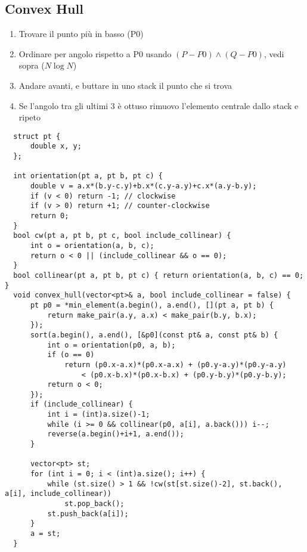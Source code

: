 \subsection{Convex Hull}
\begin{enumerate}
    \item Trovare il punto più in basso (P0)
    \item Ordinare per angolo rispetto a P0 usando $(P-P0)\wedge(Q-P0)$, vedi sopra ($N\log N$)
    \item Andare avanti, e buttare in uno stack il punto che si trova
    \item Se l’angolo tra gli ultimi 3 è ottuso rimuovo l’elemento centrale dallo stack e ripeto
\end{enumerate}

\begin{lstlisting}
  struct pt {
      double x, y;
  };

  int orientation(pt a, pt b, pt c) {
      double v = a.x*(b.y-c.y)+b.x*(c.y-a.y)+c.x*(a.y-b.y);
      if (v < 0) return -1; // clockwise
      if (v > 0) return +1; // counter-clockwise
      return 0;
  }
  bool cw(pt a, pt b, pt c, bool include_collinear) {
      int o = orientation(a, b, c);
      return o < 0 || (include_collinear && o == 0);
  }
  bool collinear(pt a, pt b, pt c) { return orientation(a, b, c) == 0; }
  void convex_hull(vector<pt>& a, bool include_collinear = false) {
      pt p0 = *min_element(a.begin(), a.end(), [](pt a, pt b) {
          return make_pair(a.y, a.x) < make_pair(b.y, b.x);
      });
      sort(a.begin(), a.end(), [&p0](const pt& a, const pt& b) {
          int o = orientation(p0, a, b);
          if (o == 0)
              return (p0.x-a.x)*(p0.x-a.x) + (p0.y-a.y)*(p0.y-a.y)
                  < (p0.x-b.x)*(p0.x-b.x) + (p0.y-b.y)*(p0.y-b.y);
          return o < 0;
      });
      if (include_collinear) {
          int i = (int)a.size()-1;
          while (i >= 0 && collinear(p0, a[i], a.back())) i--;
          reverse(a.begin()+i+1, a.end());
      }

      vector<pt> st;
      for (int i = 0; i < (int)a.size(); i++) {
          while (st.size() > 1 && !cw(st[st.size()-2], st.back(), a[i], include_collinear))
              st.pop_back();
          st.push_back(a[i]);
      }
      a = st;
  }
\end{lstlisting}
